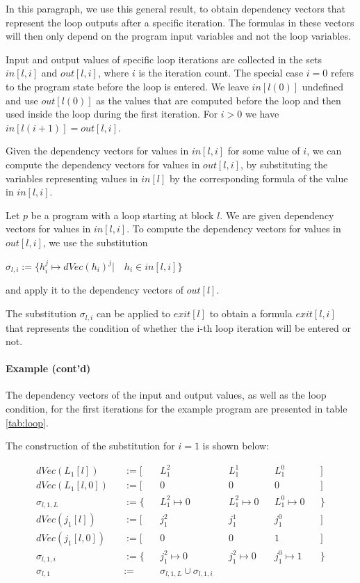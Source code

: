In this paragraph, we use this general result, to obtain dependency vectors that represent the loop outputs after a specific iteration. The formulas in these vectors will then only depend on the program input variables and not the loop variables.

Input and output values of specific loop iterations are collected in the sets $in[l, i]$ and $out[l, i]$, where $i$ is the iteration count. The special case $i = 0$ refers to the program state before the loop is entered. We leave $in[l(0)]$ undefined and use $out[l(0)]$ as the values that are computed before the loop and then used inside the loop during the first iteration. For $i > 0$ we have $in[l(i + 1)] = out[l, i]$.

Given the dependency vectors for values in $in[l, i]$ for some value of $i$, we can compute the dependency vectors for values in $out[l, i]$, by substituting the variables representing values in $in[l]$ by the corresponding formula of the value in $in[l, i]$.

\begin{definition}
    Let $p$ be a program with a loop starting at block $l$. We are given dependency vectors for values in $in[l, i]$. To compute the dependency vectors for values in $out[l, i]$, we use the substitution
    \begin{center}
        $\sigma_{l, i} := \{h_i^j \mapsto dVec(h_i)^j | \quad h_i \in in[l, i]\}$
    \end{center}
    and apply it to the dependency vectors of $out[l]$.
\end{definition}

The substitution $\sigma_{l, i}$ can be applied to $exit[l]$ to obtain a formula $exit[l, i]$ that represents the condition of whether the i-th loop iteration will be entered or not.

\paragraph{Example (cont'd)} The dependency vectors of the input and output values, as well as the loop condition, for the first iterations for the example program are presented in table \ref{tab:loop}.

The construction of the substitution for $i = 1$ is shown below:

\begin{align*}
dVec(L_1[l]) &&:= [ && L_1^2 && L_1^1 && L_1^0 && ]\\
dVec(L_1[l, 0]) &&:= [ && 0 && 0 && 0 && ]\\
\sigma_{l, 1, L} && := \{ && L_1^2 \mapsto 0 && L_1^2 \mapsto 0 && L_1^0 \mapsto 0 && \} \\[1em]
dVec(j_1[l]) &&:= [ && j_1^2 && j_1^1 && j_1^0 && ]\\
dVec(j_1[l, 0]) &&:= [ && 0 && 0 && 1 && ]\\
\sigma_{l, 1, i} && := \{ && j_1^2 \mapsto 0 && j_1^2 \mapsto 0 && j_1^0 \mapsto 1 && \} \\[1em]
\sigma_{l, 1} && := &&\sigma_{l, 1, L} \cup \sigma_{l, 1, i}
\end{align*}

